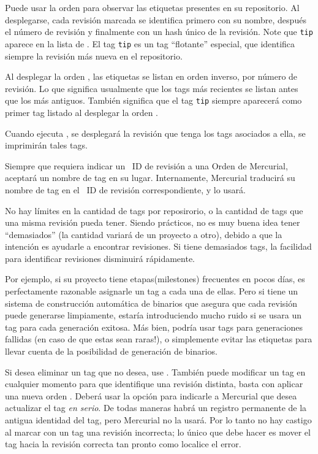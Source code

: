 Puede usar la orden  para observar las etiquetas presentes en
su repositorio. Al desplegarse, cada revisión marcada se identifica
primero con su nombre, después el número de revisión y finalmente con
un hash único de la revisión.
Note que \texttt{tip} aparece en la lista de .  El tag
\texttt{tip} es un tag ``flotante'' especial, que identifica siempre
la revisión más nueva en el repositorio.

Al desplegar la orden , las etiquetas se listan en orden
inverso, por número de revisión. Lo que significa usualmente que los
tags más recientes se listan antes que los más antiguos. También
significa que el tag \texttt{tip} siempre aparecerá como primer tag
listado al desplegar la orden .

Cuando ejecuta , se desplegará la revisión que tenga los
tags asociados a ella, se imprimirán tales tags.

Siempre que requiera indicar un ~ID de revisión a una Orden de
Mercurial, aceptará un nombre de tag en su lugar.  Internamente,
Mercurial traducirá su nombre de tag en el ~ID de revisión
correspondiente, y lo usará.

No hay límites en la cantidad de tags por reposirorio, o la cantidad
de tags que una misma revisión pueda tener. Siendo prácticos, no es
muy buena idea tener ``demasiados'' (la cantidad variará de un
proyecto a otro), debido a que la intención es ayudarle a encontrar
revisiones. Si tiene demasiados tags, la facilidad para identificar
revisiones disminuirá rápidamente.

Por ejemplo, si su proyecto tiene etapas(milestones) frecuentes en pocos
días, es perfectamente razonable asignarle un tag a cada una de
ellas. Pero si tiene un sistema de construcción automática de binarios
que asegura que cada revisión puede generarse limpiamente, estaría
introduciendo mucho ruido si se usara un tag para cada generación
exitosa. Más bien, podría usar tags para generaciones fallidas (en
caso de que estas sean raras!), o simplemente evitar las etiquetas para
llevar cuenta de la posibilidad de generación de binarios.


Si desea eliminar un tag que no desea, use
.  
También puede modificar un tag en cualquier momento para que
identifique una revisión distinta, basta con aplicar una nueva orden
. Deberá usar la opción  para indicarle a
Mercurial que desea actualizar el tag \emph{en serio}.
De todas maneras habrá un registro permanente de la antigua identidad
del tag, pero Mercurial no la usará. Por lo tanto no hay castigo al
marcar con un tag una revisión incorrecta; lo único que debe hacer es
mover el tag hacia la revisión correcta tan pronto como localice el
error.

